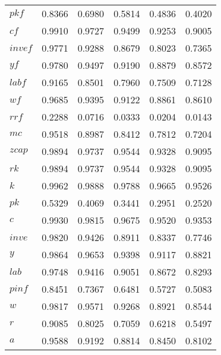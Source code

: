 \begin{center}
\begin{longtable}{lccccc}
$pkf      $	 & 	     0.8366	 & 	     0.6980	 & 	     0.5814	 & 	     0.4836	 & 	     0.4020 \\ 
$cf       $	 & 	     0.9910	 & 	     0.9727	 & 	     0.9499	 & 	     0.9253	 & 	     0.9005 \\ 
$invef    $	 & 	     0.9771	 & 	     0.9288	 & 	     0.8679	 & 	     0.8023	 & 	     0.7365 \\ 
$yf       $	 & 	     0.9780	 & 	     0.9497	 & 	     0.9190	 & 	     0.8879	 & 	     0.8572 \\ 
$labf     $	 & 	     0.9165	 & 	     0.8501	 & 	     0.7960	 & 	     0.7509	 & 	     0.7128 \\ 
$wf       $	 & 	     0.9685	 & 	     0.9395	 & 	     0.9122	 & 	     0.8861	 & 	     0.8610 \\ 
$rrf      $	 & 	     0.2288	 & 	     0.0716	 & 	     0.0333	 & 	     0.0204	 & 	     0.0143 \\ 
$mc       $	 & 	     0.9518	 & 	     0.8987	 & 	     0.8412	 & 	     0.7812	 & 	     0.7204 \\ 
$zcap     $	 & 	     0.9894	 & 	     0.9737	 & 	     0.9544	 & 	     0.9328	 & 	     0.9095 \\ 
$rk       $	 & 	     0.9894	 & 	     0.9737	 & 	     0.9544	 & 	     0.9328	 & 	     0.9095 \\ 
$k        $	 & 	     0.9962	 & 	     0.9888	 & 	     0.9788	 & 	     0.9665	 & 	     0.9526 \\ 
$pk       $	 & 	     0.5329	 & 	     0.4069	 & 	     0.3441	 & 	     0.2951	 & 	     0.2520 \\ 
$c        $	 & 	     0.9930	 & 	     0.9815	 & 	     0.9675	 & 	     0.9520	 & 	     0.9353 \\ 
$inve     $	 & 	     0.9820	 & 	     0.9426	 & 	     0.8911	 & 	     0.8337	 & 	     0.7746 \\ 
$y        $	 & 	     0.9864	 & 	     0.9653	 & 	     0.9398	 & 	     0.9117	 & 	     0.8821 \\ 
$lab      $	 & 	     0.9748	 & 	     0.9416	 & 	     0.9051	 & 	     0.8672	 & 	     0.8293 \\ 
$pinf     $	 & 	     0.8451	 & 	     0.7367	 & 	     0.6481	 & 	     0.5727	 & 	     0.5083 \\ 
$w        $	 & 	     0.9817	 & 	     0.9571	 & 	     0.9268	 & 	     0.8921	 & 	     0.8544 \\ 
$r        $	 & 	     0.9085	 & 	     0.8025	 & 	     0.7059	 & 	     0.6218	 & 	     0.5497 \\ 
$a        $	 & 	     0.9588	 & 	     0.9192	 & 	     0.8814	 & 	     0.8450	 & 	     0.8102 \\ 

\end{longtable}
\end{center}
